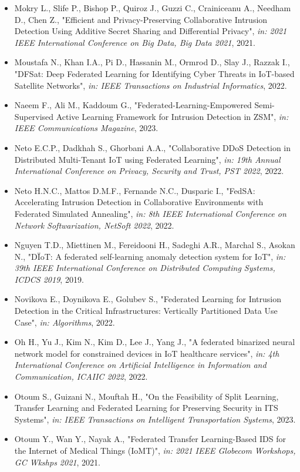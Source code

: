\begin{itemize}
  \item Mokry L., Slife P., Bishop P., Quiroz J., Guzzi C., Crainiceanu A., Needham D., Chen Z., "Efficient and Privacy-Preserving Collaborative Intrusion Detection Using Additive Secret Sharing and Differential Privacy", \textit{in: 2021 IEEE International Conference on Big Data, Big Data 2021}, 2021.
  \item Moustafa N., Khan I.A., Pi D., Hassanin M., Ormrod D., Slay J., Razzak I., "DFSat: Deep Federated Learning for Identifying Cyber Threats in IoT-based Satellite Networks", \textit{in: IEEE Transactions on Industrial Informatics}, 2022.
  \item Naeem F., Ali M., Kaddoum G., "Federated-Learning-Empowered Semi-Supervised Active Learning Framework for Intrusion Detection in ZSM", \textit{in: IEEE Communications Magazine}, 2023.
  \item Neto E.C.P., Dadkhah S., Ghorbani A.A., "Collaborative DDoS Detection in Distributed Multi-Tenant IoT using Federated Learning", \textit{in: 19th Annual International Conference on Privacy, Security and Trust, PST 2022}, 2022.
  \item Neto H.N.C., Mattos D.M.F., Fernande N.C., Dusparic I., "FedSA: Accelerating Intrusion Detection in Collaborative Environments with Federated Simulated Annealing", \textit{in: 8th IEEE International Conference on Network Softwarization, NetSoft 2022}, 2022.
  \item Nguyen T.D., Miettinen M., Fereidooni H., Sadeghi A.R., Marchal S., Asokan N., "DÏoT: A federated self-learning anomaly detection system for IoT", \textit{in: 39th IEEE International Conference on Distributed Computing Systems, ICDCS 2019}, 2019.
  \item Novikova E., Doynikova E., Golubev S., "Federated Learning for Intrusion Detection in the Critical Infrastructures: Vertically Partitioned Data Use Case", \textit{in: Algorithms}, 2022.
  \item Oh H., Yu J., Kim N., Kim D., Lee J., Yang J., "A federated binarized neural network model for constrained devices in IoT healthcare services", \textit{in: 4th International Conference on Artificial Intelligence in Information and Communication, ICAIIC 2022}, 2022.
  \item Otoum S., Guizani N., Mouftah H., "On the Feasibility of Split Learning, Transfer Learning and Federated Learning for Preserving Security in ITS Systems", \textit{in: IEEE Transactions on Intelligent Transportation Systems}, 2023.
  \item Otoum Y., Wan Y., Nayak A., "Federated Transfer Learning-Based IDS for the Internet of Medical Things (IoMT)", \textit{in: 2021 IEEE Globecom Workshops, GC Wkshps 2021}, 2021.

\end{itemize}
